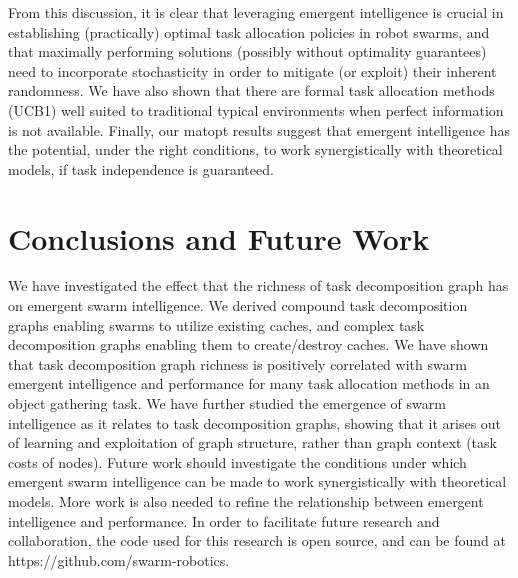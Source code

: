 {From this discussion, it is clear that leveraging emergent intelligence is crucial in
establishing (practically) optimal task allocation policies in robot swarms, and that
maximally performing solutions (possibly without optimality guarantees) need to
incorporate stochasticity in order to mitigate (or exploit) their inherent
randomness. We have also shown that there are formal task allocation methods (UCB1)
well suited to traditional typical environments when perfect information is not
available. Finally, our \gls{matopt} results suggest that emergent intelligence has the
potential, under the right conditions, to work synergistically with theoretical
models, if task independence is guaranteed.
%
\section{Conclusions and Future Work}\label{sec:conclusions}
%
We have investigated the effect that the richness of task decomposition graph has on
emergent swarm intelligence. We derived compound task decomposition graphs enabling
swarms to utilize existing caches, and complex task decomposition graphs enabling
them to create/destroy caches. We have shown that task decomposition graph richness
is positively correlated with swarm emergent intelligence and performance for many
task allocation methods in an object gathering task. We have further studied the
emergence of swarm intelligence as it relates to task decomposition graphs, showing
that it arises out of learning and exploitation of graph structure, rather than graph
context (task costs of nodes). Future work should investigate the conditions under
which emergent swarm intelligence can be made to work synergistically with
theoretical models. More work is also needed to refine the relationship between
emergent intelligence and performance. In order to facilitate future research and
collaboration, the code used for this research is open source, and can be found at
https://github.com/swarm-robotics.
}

